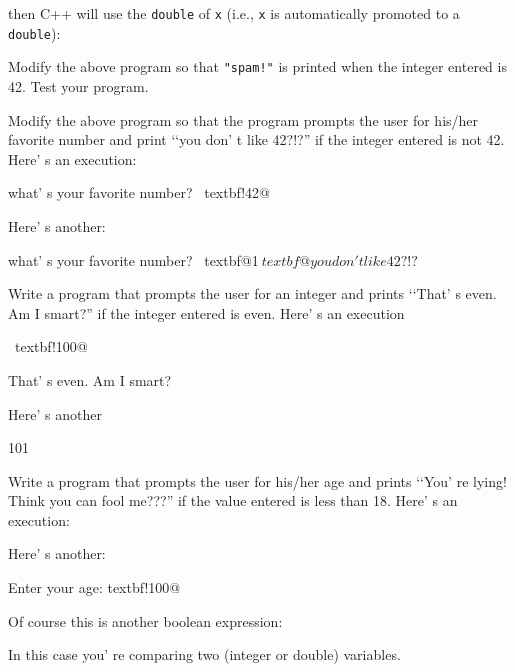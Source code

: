 
then C++ will use the \verb!double! of \verb!x! (i.e., \verb!x! is
automatically promoted to a \verb!double!):


\begin{ex}
Modify the above program so that \verb~"spam!"~ is printed when the integer entered is 42. Test your program.
\end{ex}

\begin{ex}
Modify the above program so that the program prompts the user for his/her favorite number and print \lq\lq you don' t like 42?!?'' if the integer entered is not 42. Here' s an execution:
\begin{console}[commandchars=\~\!\@]
what' s your favorite number? ~textbf!42@ 
\end{console}
Here' s another:
\begin{console}[commandchars=\~\@\$]
what' s your favorite number? ~textbf@1$
~textbf@you don't like 42?!?$  
\end{console}
\end{ex}

\begin{ex}
Write a program that prompts the user for an integer and prints \lq\lq That' s even. Am I smart?'' if the integer entered is even. Here' s an execution
\begin{console}[commandchars=\~\!\@]
~textbf!100@

That' s even. Am I smart?
\end{console}

Here' s another
\begin{console}
101 
\end{console}
\end{ex}

\begin{ex}
Write a program that prompts the user for his/her age and prints \lq\lq You' re lying! Think you can fool me???'' if the value entered is less than 18. Here' s an execution:
Here' s another:

\begin{console}[commandchars=\~\!\@]
Enter your age: textbf!100@
\end{console}
Of course this is another boolean expression:
\begin{center}
\EMPHASIZE{[var1] [bool op] [var2]}
\end{center}
In this case you' re comparing two (integer or double)
variables.
\end{ex}

